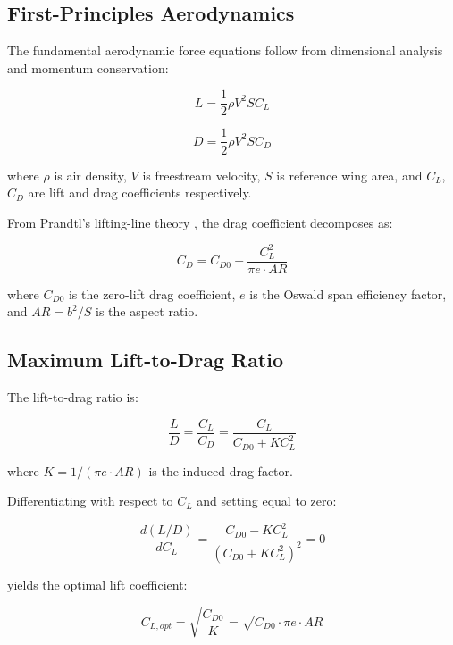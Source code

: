 \documentclass[11pt,a4paper]{article}
\begin{document}
\subsection{First-Principles Aerodynamics}

The fundamental aerodynamic force equations follow from dimensional analysis and momentum conservation:

\begin{equation}
L = \frac{1}{2}\rho V^2 S C_L
\label{eq:lift}
\end{equation}

\begin{equation}
D = \frac{1}{2}\rho V^2 S C_D
\label{eq:drag}
\end{equation}

where $\rho$ is air density, $V$ is freestream velocity, $S$ is reference wing area, and $C_L$, $C_D$ are lift and drag coefficients respectively.

From Prandtl's lifting-line theory \citep{prandtl1918}, the drag coefficient decomposes as:

\begin{equation}
C_D = C_{D0} + \frac{C_L^2}{\pi e \cdot AR}
\label{eq:drag_polar}
\end{equation}

where $C_{D0}$ is the zero-lift drag coefficient, $e$ is the Oswald span efficiency factor, and $AR = b^2/S$ is the aspect ratio.

\subsection{Maximum Lift-to-Drag Ratio}

The lift-to-drag ratio is:

\begin{equation}
\frac{L}{D} = \frac{C_L}{C_D} = \frac{C_L}{C_{D0} + K C_L^2}
\label{eq:ld_ratio}
\end{equation}

where $K = 1/(\pi e \cdot AR)$ is the induced drag factor.

Differentiating with respect to $C_L$ and setting equal to zero:

\begin{equation}
\frac{d(L/D)}{dC_L} = \frac{C_{D0} - K C_L^2}{(C_{D0} + K C_L^2)^2} = 0
\end{equation}

yields the optimal lift coefficient:

\begin{equation}
C_{L,opt} = \sqrt{\frac{C_{D0}}{K}} = \sqrt{C_{D0} \cdot \pi e \cdot AR}
\label{eq:cl_opt}
\end{equation}
\end{document}
